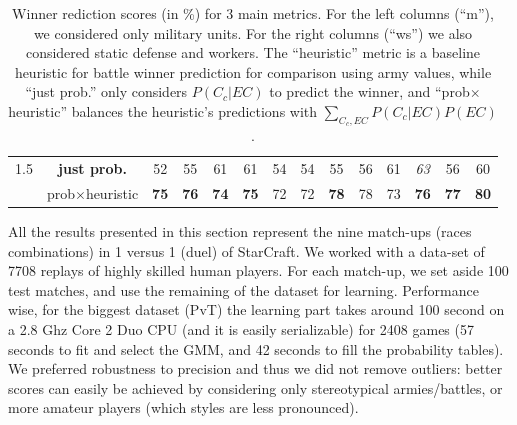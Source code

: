 \begin{table}[ht]
\begin{center}
\begin{footnotesize}
\begin{tabular}{|c|c|cc|cc|cc|cc|cc|cc|}
1.5     & \textbf{just prob.} & 52 & 55 & 61 & 61 & 54 & 54 & 55 & 56 & 61 & \textit{63} & 56 & 60 \\
    & prob$\times$heuristic & \textbf{75} & \textbf{76} & \textbf{74} & \textbf{75} & 72 & 72 & \textbf{78} & 78 & 73 & \textbf{76} & \textbf{77} & \textbf{80} \\
\hline
\end{tabular}
\label{results}
\caption{Winner rediction scores (in \%) for 3 main metrics. For the left columns (``m''), we considered only military units. For the right columns (``ws'') we also considered static defense and workers. The ``heuristic'' metric is a baseline heuristic for battle winner prediction for comparison using army values, while ``just prob.'' only considers $P(C_c|EC)$ to predict the winner, and ``prob$\times$heuristic'' balances the heuristic's predictions with $\sum_{C_c,EC}P(C_c|EC)P(EC)$.}

\end{footnotesize}
\end{center}
\end{table}
All the results presented in this section represent the nine match-ups (races combinations) in 1 versus 1 (duel) of StarCraft. We worked with a data-set of 7708 replays of highly skilled human players. For each match-up, we set aside 100 test matches, and use the remaining of the dataset for learning. Performance wise, for the biggest dataset (PvT) the learning part takes around 100 second on a 2.8 Ghz Core 2 Duo CPU (and it is easily serializable) for 2408 games (57 seconds to fit and select the GMM, and 42 seconds to fill the probability tables). %
We preferred robustness to precision and thus we did not remove outliers: better scores can easily be achieved by considering only stereotypical armies/battles, or more amateur players (which styles are less pronounced). 


